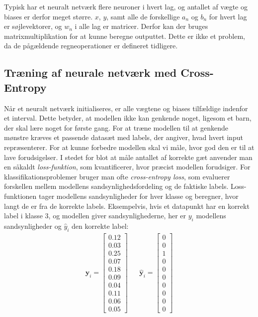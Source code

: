\documentclass{article}
\begin{document}
Typisk har et neuralt netværk flere neuroner i hvert lag, og antallet af vægte og biases er derfor meget større. $x$, $y$, samt alle de forskellige $a_n$ og $b_n$ for hvert lag er søjlevektorer, og $w_n$ i alle lag er matricer. Derfor kan der bruges matrixmultiplikation for at kunne beregne outputtet. Dette er ikke et problem, da de pågældende regneoperationer er defineret tidligere.  
\newpage
\subsection{Træning af neurale netværk med Cross-Entropy}
Når et neuralt netværk initialiseres, er alle vægtene og biases tilfældige indenfor et interval. Dette betyder, at modellen ikke kan genkende noget, ligesom et barn, der skal lære noget for første gang. For at træne modellen til at genkende mønstre kræves et passende datasæt med labels, der angiver, hvad hvert input repræsenterer. For at kunne forbedre modellen skal vi måle, hvor god den er til at lave forudsigelser. I stedet for blot at måle antallet af korrekte gæt anvender man en såkaldt \textit{loss-funktion}, som kvantificerer, hvor præcist modellen forudsiger. For klassifikationsproblemer bruger man ofte \textit{cross-entropy loss}, som evaluerer forskellen mellem modellens sandsynlighedsfordeling og de faktiske labels. Loss-funktionen tager modellens sandsynligheder for hver klasse og beregner, hvor langt de er fra de korrekte labels. \parencite{sanderson2017neural,Sanderson_2017,Nielsen_2019b} Eksempelvis, hvis et datapunkt har en korrekt label i klasse 3, og modellen giver sandsynlighederne, her er $y_i$ modellens sandsynligheder og $\hat{y}_i$ den korrekte label:
\begin{align}
\mathbf{y}_i = \begin{bmatrix}
0.12 \\
0.03 \\
0.25 \\
0.07 \\
0.18 \\
0.09 \\
0.04 \\
0.11 \\
0.06 \\
0.05
\end{bmatrix}
&&
\hat{\mathbf{y}}_i = \begin{bmatrix}
0 \\
0 \\
1 \\
0 \\
0 \\
0 \\
0 \\
0 \\
0 \\
0
\end{bmatrix}
\end{align}
\end{document}
